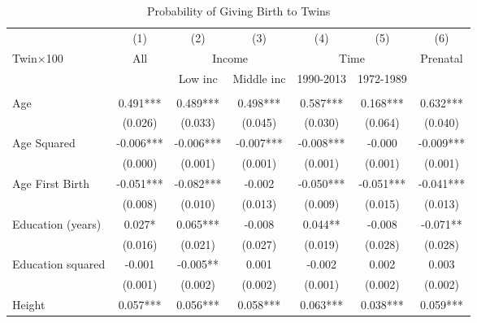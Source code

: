 \begin{landscape}\begin{table}[htpb!] 
\caption{Probability of Giving Birth to Twins} \label{TWINtab:twinreg1} 
\begin{center}\begin{tabular}{lcccccc} \toprule \toprule 
&(1)&(2)&(3)&(4)&(5)&(6)\\
Twin$\times$100&All&\multicolumn{2}{c}{Income}&\multicolumn{2}{c}{Time}&Prenatal\\
 \cmidrule(r){3-4} \cmidrule(r){5-6} 
&&Low inc&Middle inc&1990-2013&1972-1989&\\\midrule
\begin{footnotesize}\end{footnotesize}&\begin{footnotesize}\end{footnotesize}&\begin{footnotesize}\end{footnotesize}&\begin{footnotesize}\end{footnotesize}&\begin{footnotesize}\end{footnotesize}&\begin{footnotesize}\end{footnotesize}&\begin{footnotesize}\end{footnotesize}\\
Age&0.491***&0.489***&0.498***&0.587***&0.168***&0.632***\\
&(0.026)&(0.033)&(0.045)&(0.030)&(0.064)&(0.040)\\
Age Squared&-0.006***&-0.006***&-0.007***&-0.008***&-0.000&-0.009***\\
&(0.000)&(0.001)&(0.001)&(0.001)&(0.001)&(0.001)\\
Age First Birth&-0.051***&-0.082***&-0.002&-0.050***&-0.051***&-0.041***\\
&(0.008)&(0.010)&(0.013)&(0.009)&(0.015)&(0.013)\\
Education (years)&0.027*&0.065***&-0.008&0.044**&-0.008&-0.071**\\
&(0.016)&(0.021)&(0.027)&(0.019)&(0.028)&(0.028)\\
Education squared&-0.001&-0.005**&0.001&-0.002&0.002&0.003\\
&(0.001)&(0.002)&(0.002)&(0.001)&(0.002)&(0.002)\\
Height&0.057***&0.056***&0.058***&0.063***&0.038***&0.059***\\

\end{tabular}
\end{center}
\end{table}
\end{landscape}
